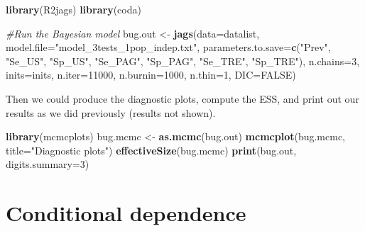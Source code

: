 \documentclass[
]{book}
\newenvironment{Shaded}{\begin{snugshade}}{\end{snugshade}}
\newcommand{\AttributeTok}[1]{\textcolor[rgb]{0.13,0.29,0.53}{#1}}
\newcommand{\CommentTok}[1]{\textcolor[rgb]{0.56,0.35,0.01}{\textit{#1}}}
\newcommand{\ConstantTok}[1]{\textcolor[rgb]{0.56,0.35,0.01}{#1}}
\newcommand{\DecValTok}[1]{\textcolor[rgb]{0.00,0.00,0.81}{#1}}
\newcommand{\FunctionTok}[1]{\textcolor[rgb]{0.13,0.29,0.53}{\textbf{#1}}}
\newcommand{\NormalTok}[1]{#1}
\newcommand{\OtherTok}[1]{\textcolor[rgb]{0.56,0.35,0.01}{#1}}
\newcommand{\StringTok}[1]{\textcolor[rgb]{0.31,0.60,0.02}{#1}}
\begin{document}
\begin{Shaded}
\begin{Highlighting}[]
\FunctionTok{library}\NormalTok{(R2jags)}
\FunctionTok{library}\NormalTok{(coda)}

\CommentTok{\#Run the Bayesian model}
\NormalTok{bug.out }\OtherTok{\textless{}{-}} \FunctionTok{jags}\NormalTok{(}\AttributeTok{data=}\NormalTok{datalist,                             }
               \AttributeTok{model.file=}\StringTok{"model\_3tests\_1pop\_indep.txt"}\NormalTok{,     }
               \AttributeTok{parameters.to.save=}\FunctionTok{c}\NormalTok{(}\StringTok{"Prev"}\NormalTok{, }\StringTok{"Se\_US"}\NormalTok{, }\StringTok{"Sp\_US"}\NormalTok{, }\StringTok{"Se\_PAG"}\NormalTok{, }\StringTok{"Sp\_PAG"}\NormalTok{, }\StringTok{"Se\_TRE"}\NormalTok{, }\StringTok{"Sp\_TRE"}\NormalTok{),               }
               \AttributeTok{n.chains=}\DecValTok{3}\NormalTok{,                                 }
               \AttributeTok{inits=}\NormalTok{inits,                                }
               \AttributeTok{n.iter=}\DecValTok{11000}\NormalTok{,                                }
               \AttributeTok{n.burnin=}\DecValTok{1000}\NormalTok{,                              }
               \AttributeTok{n.thin=}\DecValTok{1}\NormalTok{,                                   }
               \AttributeTok{DIC=}\ConstantTok{FALSE}\NormalTok{)                                   }
\end{Highlighting}
\end{Shaded}

Then we could produce the diagnostic plots, compute the ESS, and print out our results as we did previously (results not shown).

\begin{Shaded}
\begin{Highlighting}[]
\FunctionTok{library}\NormalTok{(mcmcplots)}
\NormalTok{bug.mcmc }\OtherTok{\textless{}{-}} \FunctionTok{as.mcmc}\NormalTok{(bug.out)          }
\FunctionTok{mcmcplot}\NormalTok{(bug.mcmc, }\AttributeTok{title=}\StringTok{"Diagnostic plots"}\NormalTok{) }
\FunctionTok{effectiveSize}\NormalTok{(bug.mcmc)}
\FunctionTok{print}\NormalTok{(bug.out, }\AttributeTok{digits.summary=}\DecValTok{3}\NormalTok{) }
\end{Highlighting}
\end{Shaded}

\section{Conditional dependence}\label{conditional-dependence-1}
\end{document}
